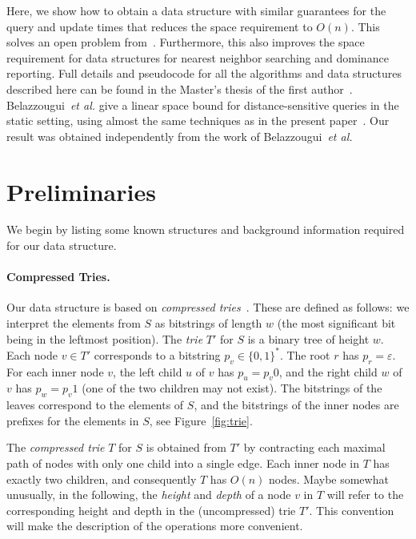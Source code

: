 \documentclass[a4paper,11pt]{article}
\newcommand{\eps}{\varepsilon}
\newcommand{\etal}{\emph{et al.}\xspace}
\newcommand{\?}{\mskip1.5mu}
\begin{document}
Here, we show how to obtain a data structure with similar
guarantees for the query and update times that reduces the
space requirement to $O(n)$. This solves an open problem 
from~\cite{BoseDoDuHoMo13}. Furthermore,  this also improves the space 
requirement for data structures for nearest neighbor searching
and dominance reporting.
Full details and pseudocode for all the algorithms and
data structures described here can 
be found in the Master's thesis of the first author~\cite{Ehrhardt15}.
Belazzougui~\etal give a linear space bound for distance-sensitive
queries in the static setting, using almost the same 
techniques as in the present paper~\cite{BelazzougiBoVi12}. Our 
result was obtained independently from the work of 
Belazzougui~\etal

\section{Preliminaries}
\label{sec:prelim}

We begin by listing some known structures and background information
required for our data structure.

\paragraph{Compressed Tries.}
Our data structure is based on \emph{compressed
tries}~\cite{CormenLeRiSt09}. These are defined as
follows: we interpret the elements from $S$ as bitstrings 
of length $w$ (the most significant bit being in the leftmost
position). The \emph{trie} $T'$ for $S$ is a binary tree
of height $w$. Each node $v \in T'$ corresponds
to a bitstring $p_v \in \{0,1\}^*$. The root $r$ has
$p_r = \eps$. For each inner node $v$, the left
child $u$ of $v$  has $p_u = p_v0$, and the
right child $w$ of $v$ has $p_w = p_v1$ (one of the
two children may not exist). The bitstrings of the 
leaves correspond to the elements of $S$, and
the bitstrings of the inner nodes are prefixes
for the elements in $S$, see Figure~\ref{fig:trie}.

The \emph{compressed trie} $T$ for $S$ is obtained
from $T'$ by contracting each maximal path of nodes
with only one child into a single edge. 
Each inner node in $T$ has exactly two children, and
consequently $T$ has $O(n)$ nodes.
Maybe somewhat unusually, in the following, the 
\emph{height} and \emph{depth} of a node $v$ in $T$ 
will refer to the corresponding
height and depth in the (uncompressed) trie $T'$.
This convention will make the description of the operations more
convenient.
\end{document}

